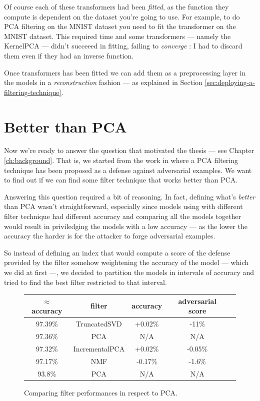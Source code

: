 Of course each of these transformers had been \emph{fitted}, as the
function they compute is dependent on the dataset you're going to use.
For example, to do PCA filtering on the MNIST dataset you need to fit
the transformer on the MNIST dataset. This required time and some
transformers --- namely the KernelPCA --- didn't succeeed in fitting,
failing to \emph{converge} : I had to discard them even if they had an
inverse function.

Once transformers has been fitted we can add them as a preprocessing
layer in the models in a \emph{reconstruction} fashion --- as explained
in Section \ref{sec:deploying-a-filtering-technique}.

\section{Better than PCA}

Now we're ready to answer the question that motivated the thesis ---
see Chapter \ref{ch:background}. That is, we started from the work in
\cite{bhagoji2018enhancing} where a PCA filtering technique has been
proposed as a defense against adversarial examples. We want to find out
if we can find some filter technique that works better than PCA.

Answering this question required a bit of reasoning. In fact, defining
what's \emph{better} than PCA wasn't straightforward, especially since
models using with different filter technique had different
accuracy and comparing all the models together would result in
priviledging the models with a low accuracy --- as the lower the
accuracy the harder is for the attacker to forge adversarial examples.

So instead of defining an index that would compute a score of the
defense provided by the filter somehow weightening the accuracy of the
model --- which we did at first ---, we decided to partition the models
in intervals of accuracy and tried to find the best filter restricted
to that interval.

\begin{figure}
  \centering
  \begin{tabular}{|c|c|c|c|c|}
    \hline
    $\approx$accuracy & filter & accuracy & adversarial score\\
    \hline
    \hline
    97.39\% & TruncatedSVD & +0.02\% & -11\% \\
    \hline
    97.36\% & PCA & N/A & N/A \\
    \hline
    97.32\% & IncrementalPCA & +0.02\% & -0.05\% \\
    \hline
    97.17\% & NMF & -0.17\% & -1.6\% \\
    \hline
    93.8\% & PCA & N/A & N/A \\
    \hline
  \end{tabular}
  \caption{Comparing filter performances in respect to PCA.}
  \label{fig:filters-comparison}
\end{figure}

